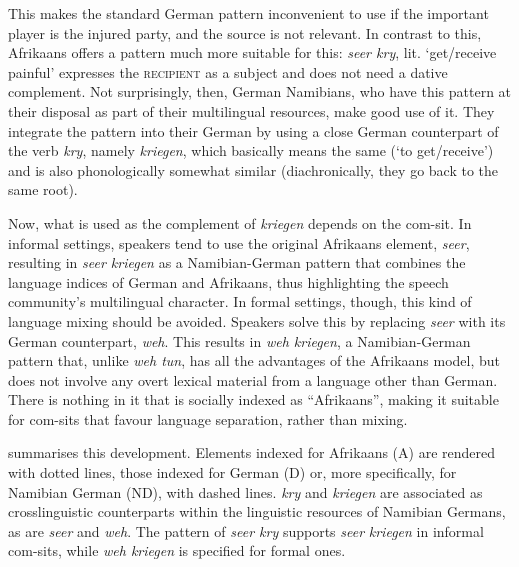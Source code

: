 This makes the standard German pattern inconvenient to use if the important player is the injured party, and the source is not relevant. In contrast to this, Afrikaans offers a pattern much more suitable for this: \textit{seer kry}, lit. ‘get/receive painful’ expresses the \textsc{recipient} as a subject and does not need a dative complement. Not surprisingly, then, German Namibians, who have this pattern at their disposal as part of their multilingual resources, make good use of it. They integrate the pattern into their German by using a close German counterpart of the verb \textit{kry}, namely \textit{kriegen}, which basically means the same (‘to get/receive’) and is also phonologically somewhat similar (diachronically, they go back to the same root).

Now, what is used as the complement of \textit{kriegen} depends on the com-sit. In informal settings, speakers tend to use the original Afrikaans element, \textit{seer}, resulting in \textit{seer kriegen} as a Namibian-German pattern that combines the language indices of German and Afrikaans, thus highlighting the speech community’s multilingual character. In formal settings, though, this kind of language mixing should be avoided. Speakers solve this by replacing \textit{seer} with its German counterpart, \textit{weh}. This results in \textit{weh kriegen}, a Namibian-German pattern that, unlike \textit{weh tun}, has all the advantages of the Afrikaans model, but does not involve any overt lexical material from a language other than German. There is nothing in it that is socially indexed as “Afrikaans”, making it suitable for com-sits that favour language separation, rather than mixing.

 summarises this development. Elements indexed for Afrikaans (A) are rendered with dotted lines, those indexed for German (D) or, more specifically, for Namibian German (ND), with dashed lines. \textit{kry} and \textit{kriegen} are associated as crosslinguistic counterparts within the linguistic resources of Namibian Germans, as are \textit{seer} and \textit{weh}. The pattern of \textit{seer kry} supports \textit{seer} \textit{kriegen} in informal com-sits, while \textit{weh kriegen} is specified for formal ones.



